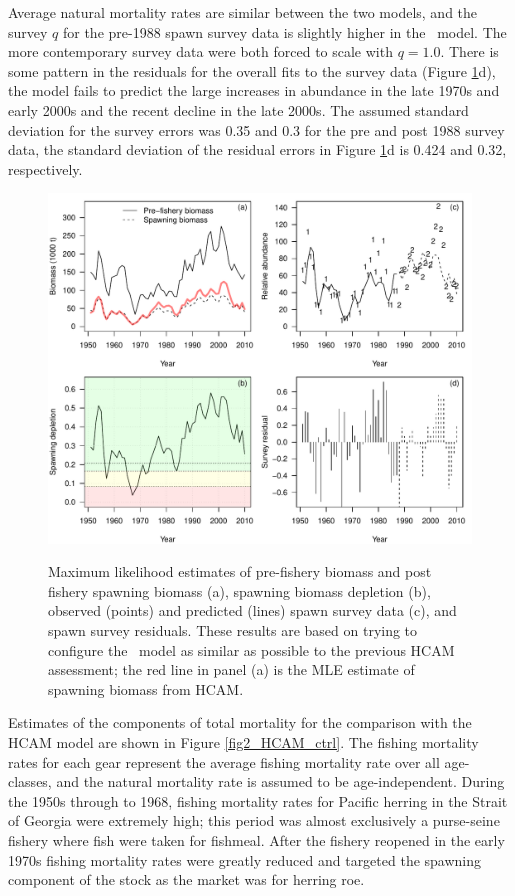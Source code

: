 
Average natural mortality rates are similar between the two models, and the survey $q$ for the pre-1988 spawn survey data is slightly higher in the \iscam\ model.  The more contemporary survey data were both forced to scale with $q=1.0$.  There is some pattern in the residuals for the overall fits to the survey data (Figure \ref{fig1_HCAM_ctrl}d), the model fails to predict the large increases in abundance in the late 1970s and early 2000s and the recent decline in the late 2000s.  The assumed standard deviation for the survey errors was 0.35 and 0.3 for the pre and post 1988 survey data, the standard deviation of the residual errors in Figure \ref{fig1_HCAM_ctrl}d is 0.424 and 0.32, respectively.
	
\begin{figure}[!tbp]
	\includegraphics[width=\textwidth]{Figs/fig1_HCAM_ctrl.pdf}\\
	\caption{Maximum likelihood estimates of pre-fishery biomass and post fishery spawning biomass (a), spawning biomass depletion (b), observed (points) and predicted (lines) spawn survey data (c), and spawn survey residuals.  These results are based on trying to configure the \iscam\ model as similar as possible to the previous HCAM assessment; the red line in panel (a) is the MLE estimate of spawning biomass from HCAM.}\label{fig1_HCAM_ctrl}
\end{figure}


Estimates of the components of total mortality for the comparison with the HCAM model are shown in Figure \ref{fig2_HCAM_ctrl}.  The fishing mortality rates for each gear represent the average fishing mortality rate over all age-classes, and the natural mortality rate is assumed to be age-independent.  During the 1950s through to 1968, fishing mortality rates for Pacific herring in the Strait of Georgia were extremely high; this period was almost exclusively a purse-seine fishery where fish were taken for fishmeal.  After the fishery reopened in the early 1970s fishing mortality rates were greatly reduced and targeted the spawning component of the stock as the market was for herring roe. 

